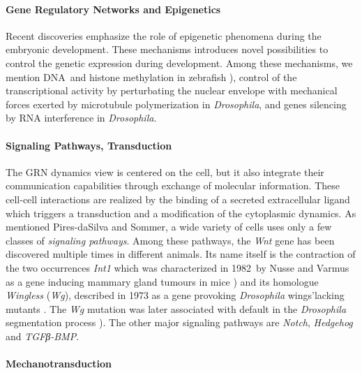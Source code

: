 \paragraph{Gene Regulatory Networks and Epigenetics}


  Recent discoveries emphasize the role of epigenetic phenomena during the embryonic development. These mechanisms introduces novel possibilities to control the genetic expression during development. Among these mechanisms, we mention DNA and histone methylation in zebrafish \cite{Lindeman:2010ia}\cite{Lindeman:2011fn}), control of the transcriptional activity by perturbating the nuclear envelope with mechanical forces exerted by microtubule polymerization in \textit{Drosophila}\cite{Hampoelz:2011wv}, and genes silencing by RNA interference in \textit{Drosophila}\cite{Yamanaka:2012da}. 

\paragraph{Signaling Pathways, Transduction}


  The GRN dynamics view is centered on the cell, but it also integrate their communication capabilities through exchange of molecular information. These cell-cell interactions are realized by the binding of a secreted extracellular ligand which triggers a transduction and a modification of the cytoplasmic dynamics. As mentioned Pires-daSilva and Sommer, a wide variety of cells uses only a few classes of \textit{signaling pathways}\cite{PiresdaSilva:2003bj}. Among these pathways, the \textit{Wnt} gene has been discovered multiple times in different animals. Its name itself is the contraction of the two occurrences \textit{Int1} which was characterized in 1982 by Nusse and Varmus as a gene inducing mammary gland tumours in mice \cite{Nusse:1982wu}) and its homologue \textit{Wingless} (\textit{Wg}), described in 1973 as a gene provoking \textit{Drosophila} wings'lacking mutants \cite{Sharma:1973wy}. The \textit{Wg} mutation was later associated with default in the \textit{Drosophila} segmentation process \cite{NussleinVolhard:1980wg}). The other major signaling pathways are \textit{Notch}\cite{ArtavanisTsakonas:1999ts}\cite{Bray:2006fe}\cite{Fuss:2002vw}, \textit{Hedgehog}\cite{Wicking:1999ju}\cite{Jiang:2008ia} and \textit{TGFβ-BMP}\cite{Wu:2009ih}. 

\paragraph{Mechanotransduction}



